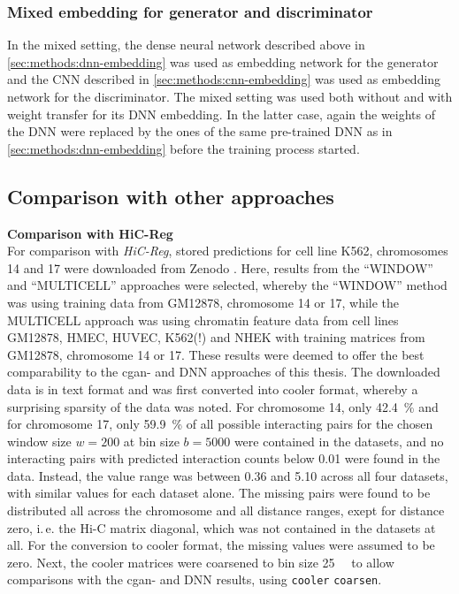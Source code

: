 \subsubsection{Mixed embedding for generator and discriminator} \label{sec:methods:mixed-embedding}
In the mixed setting, the dense neural network described above in \cref{sec:methods:dnn-embedding} was used as  
embedding network for the generator and the CNN described in \cref{sec:methods:cnn-embedding} was used as embedding
network for the discriminator.
The mixed setting was used both without and with weight transfer for its DNN embedding.
In the latter case, again the weights of the DNN were replaced by the ones of the same pre-trained DNN as in \cref{sec:methods:dnn-embedding}
 before the training process started.

\subsection{Comparison with other approaches} \label{sec:methods:comparison}
\textbf{Comparison with HiC-Reg}\\
For comparison with \emph{HiC-Reg}, stored predictions for cell line K562, chromosomes 14 and 17 were downloaded from Zenodo \cite{ShiluZhang2019,ShiluZhang2019a}.
Here, results from the ``WINDOW'' and ``MULTICELL'' approaches were selected, whereby the ``WINDOW'' method was using training data from GM12878, chromosome 14 or 17, 
while the MULTICELL approach was using chromatin feature data from cell lines GM12878, HMEC, HUVEC, K562(!) and NHEK with training matrices from GM12878, chromosome 14 or 17.
These results were deemed to offer the best comparability to the \acrshort{cgan}- and DNN approaches of this thesis.
The downloaded data is in text format and was first converted into cooler format, whereby a surprising sparsity of the data was noted.
For chromosome 14, only \SI{42.4}{\percent} and for chromosome 17, only \SI{59.9}{\percent} of all possible interacting pairs 
for the chosen window size $w=200$ at bin size $b=5000$ were contained in the datasets, 
and no interacting pairs with predicted interaction counts below 0.01 were found in the data. 
Instead, the value range was between 0.36 and 5.10 across all four datasets, with similar values for each dataset alone.
The missing pairs were found to be distributed all across the chromosome and all distance ranges, exept for distance zero, i.\,e. the Hi-C matrix diagonal, which was not contained in the datasets at all.
For the conversion to cooler format, the missing values were assumed to be zero.
Next, the cooler matrices were coarsened to bin size \SI{25}{\kilo\bp} to allow comparisons with the \acrshort{cgan}- and DNN results, using \texttt{cooler} \texttt{coarsen}.

